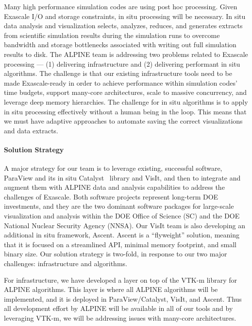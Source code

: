 Many high performance simulation codes are using post hoc processing.  
Given Exascale I/O and storage constraints, in situ processing will be necessary. 
In situ data analysis and visualization selects, analyzes, reduces, and generates extracts from scientific simulation results during the simulation runs to overcome bandwidth and storage bottlenecks associated with writing out full simulation results to disk. 
The ALPINE team is addressing two problems related to Exascale processing --- (1) delivering infrastructure and (2) delivering performant in situ algorithms.
The challenge is that our existing infrastructure tools need to be made Exascale-ready in order to 
achieve performance within simulation codes' time budgets, support many-core architectures, scale to massive concurrency, and leverage deep memory hierarchies.
The challenge for in situ algorithms is to apply in situ processing effectively without a human being in the loop.
This means that we must have adaptive approaches to automate saving the correct visualizations and data extracts.


\paragraph{Solution Strategy}

A major strategy for our team is to leverage existing, successful software, ParaView and its in situ Catalyst~\cite{Catalyst} library and VisIt, and then to integrate and augment them with ALPINE data and analysis capabilities to address the challenges of Exascale. 
%
Both software projects represent long-term DOE investments, and they are the two dominant software packages for large-scale visualization and analysis within the DOE Office of Science (SC) and the DOE National Nuclear Security Agency (NNSA). 
%
Our VisIt team is also developing an additional  in situ framework, Ascent.  Ascent is a ``flyweight'' solution, meaning that it is focused on a streamlined API, minimal memory footprint, and small binary size.
Our solution strategy is two-fold, in response to our two major challenges: infrastructure and algorithms.

For infrastructure, we have developed a layer on top of the VTK-m library for ALPINE algorithms.
This layer is where all ALPINE algorithms will be implemented, and it is deployed in ParaView/Catalyst, VisIt, and Ascent.
Thus all development effort by ALPINE will be available in all of our tools and by leveraging VTK-m, we will be addressing issues with many-core architectures.  

